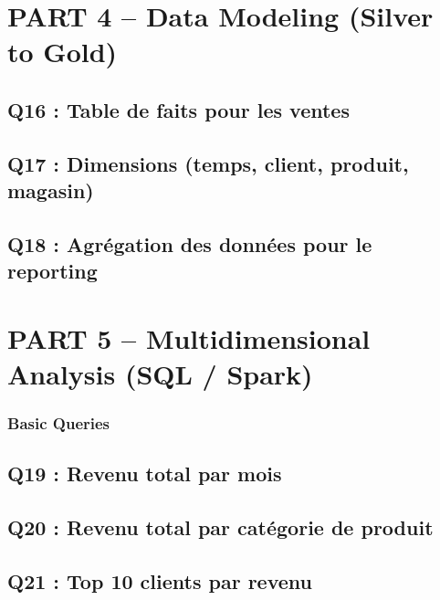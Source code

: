 \documentclass{RapportINPTCLOUD}
\begin{document}

\section{PART 4 -- Data Modeling (Silver to Gold)}

\subsection{Q16 : Table de faits pour les ventes}


\subsection{Q17 : Dimensions (temps, client, produit, magasin)}


\subsection{Q18 : Agr\'{e}gation des donn\'{e}es pour le reporting}


\section{PART 5 -- Multidimensional Analysis (SQL / Spark)}

\subsubsection*{Basic Queries}

\subsection{Q19 : Revenu total par mois}


\subsection{Q20 : Revenu total par cat\'{e}gorie de produit}


\subsection{Q21 : Top 10 clients par revenu}
\end{document}
